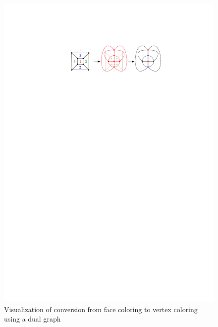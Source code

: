 \begin{figure}[H]
    \centering
    \includegraphics[width=1\textwidth]{../Resources/Figs/cubical_dual_graph.pdf}
    \caption{Visualization of conversion from face coloring to vertex coloring using a dual graph}
    \label{fig:cubical_dual_graph}
\end{figure}